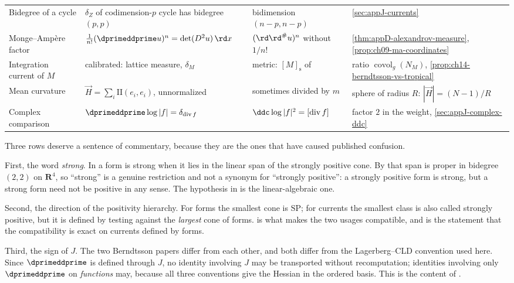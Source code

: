 \begin{center}
\begin{tabular}{@{}p{}p{}p{}p{}@{}}
Bidegree of a cycle
 & $\delta_Z$ of codimension-$p$ cycle has bidegree $(p,p)$
 & bidimension $(n-p,n-p)$
 & \cref{sec:appJ-currents} \\
Monge--Amp\`ere factor
 & $\tfrac1{n!}(\dprimeddprime u)^n=\det(D^2u)\,\rd x$
 & $(\rd\rd^\#u)^n$ without $1/n!$
 & \cref{thm:appD-alexandrov-measure},
   \cref{prop:ch09-ma-coordinates} \\
Integration current of $M$
 & calibrated: lattice measure, $\delta_M$
 & metric: $[M]_{\mathrm s}$ of \cite{Ber19Super}
 & ratio $\operatorname{covol}_g(N_M)$,
   \cref{prop:ch14-berndtsson-vs-tropical} \\
Mean curvature
 & $\vec H=\sum_i\mathrm{II}(e_i,e_i)$, unnormalized
 & sometimes divided by $m$
 & sphere of radius $R$: $|\vec H|=(N-1)/R$ \\
Complex comparison
 & $\dprimeddprime\log|f|=\delta_{\operatorname{div}f}$
 & $\ddc\log|f|^2=[\operatorname{div}f]$
 & factor $2$ in the weight,
   \cref{sec:appJ-complex-ddc} \\
\bottomrule
\end{tabular}
\end{center}

Three rows deserve a sentence of commentary, because they are the ones that
have caused published confusion.

First, the word \emph{strong}.  In \cite{Ber26Convex} a form is strong when
it lies in the linear span of the strongly positive cone.  By
 that span is proper in bidegree $(2,2)$ on
$\mathbf R^4$, so ``strong'' is a genuine restriction and not a synonym for
``strongly positive'': a strongly positive form is strong, but a strong form
need not be positive in any sense.  The hypothesis in
 is the linear-algebraic one.

Second, the direction of the positivity hierarchy.  For forms the smallest
cone is $\mathrm{SP}$; for currents the smallest class is also called
strongly positive, but it is defined by testing against the \emph{largest}
cone of forms.   is what makes the two
usages compatible, and  is the statement
that the compatibility is exact on currents defined by forms.

Third, the sign of $J$.  The two Berndtsson papers differ from each other,
and both differ from the Lagerberg--CLD convention used here.  Since
$\dprimeddprime$ is defined through $J$, no identity involving $J$ may be
transported without recomputation; identities involving only
$\dprimeddprime$ on \emph{functions} may, because all three conventions give
the Hessian in the ordered basis.  This is the content of
.

